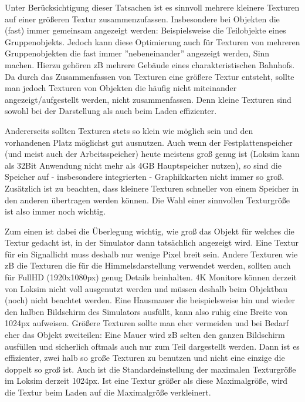 Unter Berücksichtigung dieser Tatsachen ist es sinnvoll mehrere kleinere Texturen auf einer größeren Textur zusammenzufassen. Insbesondere bei Objekten die (fast) immer gemeinsam angezeigt werden: Beispielsweise die Teilobjekte eines Gruppenobjekts. Jedoch kann diese Optimierung auch für Texturen von mehreren Gruppenobjekten die fast immer ''nebeneinander'' angezeigt werden, Sinn machen. Hierzu gehören zB mehrere Gebäude eines charakteristischen Bahnhofs. Da durch das Zusammenfassen von Texturen eine größere Textur entsteht, sollte man jedoch Texturen von Objekten die häufig nicht miteinander angezeigt/aufgestellt werden, nicht zusammenfassen. Denn kleine Texturen sind sowohl bei der Darstellung als auch beim Laden effizienter.

Andererseits sollten Texturen stets so klein wie möglich sein und den vorhandenen Platz möglichst gut ausnutzen. Auch wenn der Festplattenspeicher (und meist auch der Arbeitsspeicher) heute meistens groß genug ist (Loksim kann als 32Bit Anwendung nicht mehr als 4GB Hauptspeicher nutzen), so sind die Speicher auf - insbesondere integrierten - Graphikkarten nicht immer so groß. Zusätzlich ist zu beachten, dass kleinere Texturen schneller von einem Speicher in den anderen übertragen werden können. Die Wahl einer sinnvollen Texturgröße ist also immer noch wichtig.

Zum einen ist dabei die Überlegung wichtig, wie groß das Objekt für welches die Textur gedacht ist, in der Simulator dann tatsächlich angezeigt wird. Eine Textur für ein Signallicht muss deshalb nur wenige Pixel breit sein. Andere Texturen wie zB die Texturen die für die Himmelsdarstellung verwendet werden, sollten auch für FullHD (1920x1080px) genug Details beinhalten. 4K Monitore können derzeit von Loksim nicht voll ausgenutzt werden und müssen deshalb beim Objektbau (noch) nicht beachtet werden. Eine Hausmauer die beispielsweise hin und wieder den halben Bildschirm des Simulators ausfüllt, kann also ruhig eine Breite von 1024px aufweisen. Größere Texturen sollte man eher vermeiden und bei Bedarf eher das Objekt zweiteilen: Eine Mauer wird zB selten den ganzen Bildschirm ausfüllen und sicherlich oftmals auch nur zum Teil dargestellt werden. Dann ist es effizienter, zwei halb so große Texturen zu benutzen und nicht eine einzige die doppelt so groß ist. Auch ist die Standardeinstellung der maximalen Texturgröße im Loksim derzeit 1024px. Ist eine Textur größer als diese Maximalgröße, wird die Textur beim Laden auf die Maximalgröße verkleinert.

